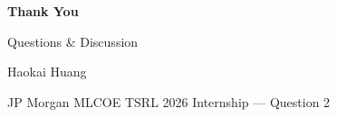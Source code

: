 \documentclass[aspectratio=169,10pt]{beamer}
\begin{document}
\begin{frame}[plain]
\begin{center}
\vspace{2cm}
{\Huge\color{jpmblue}\textbf{Thank You}}

\vspace{1cm}
{\large Questions \& Discussion}

\vspace{1.5cm}
{\normalsize Haokai Huang}

\vspace{0.3cm}
{\small JP Morgan MLCOE TSRL 2026 Internship --- Question 2}
\end{center}
\end{frame}
\end{document}

